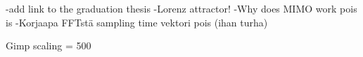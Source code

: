 -add link to the graduation thesis
-Lorenz attractor!
-Why does MIMO work pois is
-Korjaapa FFTstä sampling time vektori pois (ihan turha)

Gimp scaling = 500 
